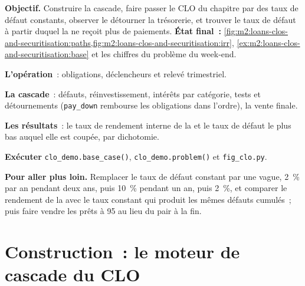 \begin{tutorial}
\textbf{Objectif.} Construire la cascade, faire passer le CLO du chapitre par des taux de défaut
constants, observer le  détourner la trésorerie, et trouver le taux de défaut
à partir duquel la  ne reçoit plus de paiements.
\textbf{État final~:} \cref{fig:m2:loans-clos-and-securitisation:paths,fig:m2:loans-clos-and-securitisation:irr},
\cref{ex:m2:loans-clos-and-securitisation:base} et les chiffres du problème du week-end.
\begin{tutsteps}
\item \textbf{L'opération}~: obligations, déclencheurs et relevé trimestriel.
\label{lst:m2:loans-clos-and-securitisation:deal}
\item \textbf{La cascade}~: défauts, réinvestissement, intérêts par catégorie, tests et
détournements (\texttt{pay\_down} rembourse les obligations dans l'ordre), la vente finale.
\label{lst:m2:loans-clos-and-securitisation:run}
\item \textbf{Les résultats}~: le taux de rendement interne de la  et le taux de défaut
le plus bas auquel elle est coupée, par dichotomie.
\label{lst:m2:loans-clos-and-securitisation:irr}
\item \textbf{Exécuter} \texttt{clo\_demo.base\_case()}, \texttt{clo\_demo.problem()} et
\texttt{fig\_clo.py}.
\end{tutsteps}
\textbf{Pour aller plus loin.} Remplacer le taux de défaut constant par une vague, 2~\% par an
pendant deux ans, puis 10~\% pendant un an, puis 2~\%, et comparer le rendement de la  avec le
taux constant qui produit les mêmes défauts cumulés~; puis faire vendre les prêts à 95
au lieu du pair à la fin.
\end{tutorial}

\section{Construction~: le moteur de cascade du CLO}\label{bld:m2:loans-clos-and-securitisation:waterfall}

